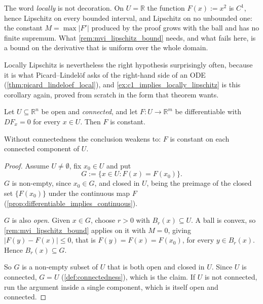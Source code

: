 \begin{importantremark}
\label{rem:locally_lipschitz_not_global}
The word \emph{locally} is not decoration. On $U = \mathbb{R}$ the function $F(x) := x^2$ is
$C^1$, hence Lipschitz on every bounded interval, and Lipschitz on no unbounded one: the constant
$M = \max|F'|$ produced by the proof grows with the ball and has no finite supremum. What
\cref{rem:mvi_lipschitz_bound} needs, and what fails here, is a bound on the derivative that is
uniform over the whole domain.

Locally Lipschitz is nevertheless the right hypothesis surprisingly often, because it is what
Picard--Lindelöf asks of the right-hand side of an ODE
(\cref{thm:picard_lindeloef_local}), and \cref{ex:c1_implies_locally_lipschitz} is this corollary
again, proved from scratch in the form that theorem wants.
\end{importantremark}

\begin{theorem}
\label{thm:zero_differential_constant}
Let $U \subseteq \mathbb{R}^n$ be open and \emph{connected}, and let $F : U \to \mathbb{R}^m$ be
differentiable with $DF_x = 0$ for every $x \in U$. Then $F$ is constant.

Without connectedness the conclusion weakens to: $F$ is constant on each connected component of
$U$.
\end{theorem}

\begin{proof}
Assume $U \neq \emptyset$, fix $x_0 \in U$ and put
\[G := \{x \in U : F(x) = F(x_0)\}.\]
$G$ is non-empty, since $x_0 \in G$, and closed in $U$, being the preimage of the closed set
$\{F(x_0)\}$ under the continuous map $F$ (\cref{prop:differentiable_implies_continuous}).

$G$ is also \emph{open}. Given $x \in G$, choose $r > 0$ with $B_r(x) \subseteq U$. A ball is
convex, so \cref{rem:mvi_lipschitz_bound} applies on it with $M = 0$, giving
$|F(y) - F(x)| \leq 0$, that is $F(y) = F(x) = F(x_0)$, for every $y \in B_r(x)$. Hence
$B_r(x) \subseteq G$.

So $G$ is a non-empty subset of $U$ that is both open and closed in $U$. Since $U$ is connected,
$G = U$ (\cref{def:connectedness}), which is the claim. If $U$ is not connected, run the argument
inside a single component, which is itself open and connected.
\end{proof}

